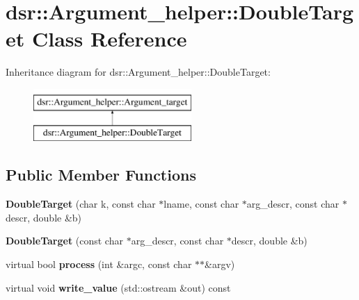 \hypertarget{classdsr_1_1_argument__helper_1_1_double_target}{
\section{dsr::Argument\_\-helper::DoubleTarget Class Reference}
\label{classdsr_1_1_argument__helper_1_1_double_target}
}
Inheritance diagram for dsr::Argument\_\-helper::DoubleTarget:\begin{figure}[H]
\begin{center}
\leavevmode
\includegraphics[height=2.000000cm]{classdsr_1_1_argument__helper_1_1_double_target}
\end{center}
\end{figure}
\subsection*{Public Member Functions}
\begin{DoxyCompactItemize}
\item 
\hypertarget{classdsr_1_1_argument__helper_1_1_double_target_aed3e046727cba857a4b59a1a9a08bed3}{
{\bfseries DoubleTarget} (char k, const char $\ast$lname, const char $\ast$arg\_\-descr, const char $\ast$descr, double \&b)}
\label{classdsr_1_1_argument__helper_1_1_double_target_aed3e046727cba857a4b59a1a9a08bed3}

\item 
\hypertarget{classdsr_1_1_argument__helper_1_1_double_target_a4cd0b54e751663b37ba61bb307ac1e63}{
{\bfseries DoubleTarget} (const char $\ast$arg\_\-descr, const char $\ast$descr, double \&b)}
\label{classdsr_1_1_argument__helper_1_1_double_target_a4cd0b54e751663b37ba61bb307ac1e63}

\item 
\hypertarget{classdsr_1_1_argument__helper_1_1_double_target_a46f012c8675d9c5b0edb08376e7184e2}{
virtual bool {\bfseries process} (int \&argc, const char $\ast$$\ast$\&argv)}
\label{classdsr_1_1_argument__helper_1_1_double_target_a46f012c8675d9c5b0edb08376e7184e2}

\item 
\hypertarget{classdsr_1_1_argument__helper_1_1_double_target_a18f128db07755a735f800dea569131f0}{
virtual void {\bfseries write\_\-value} (std::ostream \&out) const }
\label{classdsr_1_1_argument__helper_1_1_double_target_a18f128db07755a735f800dea569131f0}

\end{DoxyCompactItemize}
